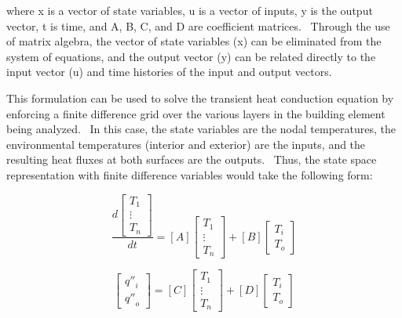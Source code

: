 where x is a vector of state variables, u is a vector of inputs, y is the output vector, t is time, and A, B, C, and D are coefficient matrices.~ Through the use of matrix algebra, the vector of state variables (x) can be eliminated from the system of equations, and the output vector (y) can be related directly to the input vector (u) and time histories of the input and output vectors.

This formulation can be used to solve the transient heat conduction equation by enforcing a finite difference grid over the various layers in the building element being analyzed.~ In this case, the state variables are the nodal temperatures, the environmental temperatures (interior and exterior) are the inputs, and the resulting heat fluxes at both surfaces are the outputs.~ Thus, the state space representation with finite difference variables would take the following form:

\begin{equation}
\frac{{d\left[ {\begin{array}{*{20}{c}}{{T_1}}\\ \vdots \\ {{T_n}}\end{array}} \right]}}{{dt}} = \left[ A \right]\left[ {\begin{array}{*{20}{c}}{{T_1}}\\ \vdots \\ {{T_n}}\end{array}} \right] + \left[ B \right]\left[ {\begin{array}{*{20}{c}}{{T_i}}\\ {{T_o}}\end{array}} \right]
\end{equation}

\begin{equation}
\left[ {\begin{array}{*{20}{c}}{{{q''}_i}}\\ {{{q''}_o}}\end{array}} \right] = \left[ C \right]\left[ {\begin{array}{*{20}{c}}{{T_1}}\\ \vdots \\ {{T_n}}\end{array}} \right] + \left[ D \right]\left[ {\begin{array}{*{20}{c}}{{T_i}}\\ {{T_o}}\end{array}} \right]
\end{equation}

